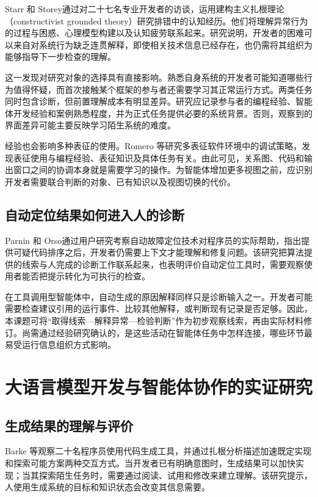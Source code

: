 Starr 和 Storey\cite{ref16}通过对二十七名专业开发者的访谈，运用建构主义扎根理论（constructivist grounded theory）研究排错中的认知经历。他们将理解异常行为的过程与困惑、心理模型构建以及认知疲劳联系起来。研究说明，开发者的困难可以来自对系统行为缺乏连贯解释，即使相关技术信息已经存在，也仍需将其组织为能够指导下一步检查的理解。

这一发现对研究对象的选择具有直接影响。熟悉自身系统的开发者可能知道哪些行为值得怀疑，而首次接触某个框架的参与者还需要学习其正常运行方式。两类任务同时包含诊断，但前置理解成本有明显差异。研究应记录参与者的编程经验、智能体开发经验和案例熟悉程度，并为正式任务提供必要的系统背景。否则，观察到的界面差异可能主要反映学习陌生系统的难度。

经验也会影响多种表征的使用。Romero 等\cite{ref34}研究多表征软件环境中的调试策略，发现表征使用与编程经验、表征知识及具体任务有关。由此可见，关系图、代码和输出窗口之间的协调本身就是需要学习的操作。为智能体增加更多视图之前，应识别开发者需要联合判断的对象、已有知识以及视图切换的代价。

\subsection{自动定位结果如何进入人的诊断}

Parnin 和 Orso\cite{ref35}通过用户研究考察自动故障定位技术对程序员的实际帮助，指出提供可疑代码排序之后，开发者仍需要上下文才能理解和修复问题。该研究把算法提供的线索与人完成的诊断工作联系起来，也表明评价自动定位工具时，需要观察使用者能否把提示转化为可执行的检查。

在工具调用型智能体中，自动生成的原因解释同样只是诊断输入之一。开发者可能需要检查建议引用的运行事件、比较其他解释，或判断现有记录是否足够。因此，本课题可将“取得线索—解释异常—检验判断”作为初步观察线索，再由实际材料修订。尚需通过经验研究确认的，是这些活动在智能体任务中怎样连接，哪些环节最易受运行信息组织方式影响。

\section{大语言模型开发与智能体协作的实证研究}

\subsection{生成结果的理解与评价}

Barke 等\cite{ref64}观察二十名程序员使用代码生成工具，并通过扎根分析描述加速既定实现和探索可能方案两种交互方式。当开发者已有明确意图时，生成结果可以加快实现；当其探索陌生任务时，需要通过阅读、试用和修改来建立理解。该研究提示，人使用生成系统的目标和知识状态会改变其信息需要。

